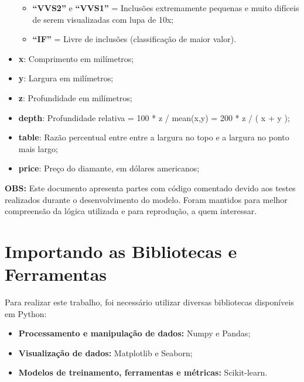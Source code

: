 \documentclass[11pt]{article}
\providecommand{\tightlist}{%
      \setlength{\itemsep}{0pt}\setlength{\parskip}{0pt}}
\begin{document}
\begin{itemize}
\begin{itemize}
      \item \textbf{``VVS2''} e \textbf{``VVS1''} = Inclusões
  extremamente pequenas e muito difíceis de serem visualizadas com lupa
  de 10x;
      \item \textbf{``IF''} = Livre de inclusões
  (classificação de maior valor).
  \end{itemize}
\item
  \textbf{x}: Comprimento em milímetros;
\item
  \textbf{y}: Largura em milímetros;
\item
  \textbf{z}: Profundidade em milímetros;
\item
  \textbf{depth}: Profundidade relativa = 100 * z / mean(x,y) = 200 * z
  / ( x + y );
\item
  \textbf{table}: Razão percentual entre entre a largura no topo e a
  largura no ponto mais largo;
\item
  \textbf{price}: Preço do diamante, em dólares americanos;

\end{itemize}

\bigskip

\textbf{OBS:} Este documento apresenta partes com código comentado
devido aos testes realizados durante o desenvolvimento do modelo.
Foram mantidos para melhor compreensão da lógica utilizada e para
reprodução, a quem interessar.

    \hypertarget{importando-as-bibliotecas-e-ferramentas}{%
\section{Importando as Bibliotecas e
Ferramentas}\label{importando-as-bibliotecas-e-ferramentas}}

    Para realizar este trabalho, foi necessário utilizar diversas
bibliotecas disponíveis em Python:

\begin{itemize}
\tightlist
\item
  \textbf{Processamento e manipulação de dados:} Numpy e Pandas;
\item
  \textbf{Visualização de dados:} Matplotlib e Seaborn;
\item
  \textbf{Modelos de treinamento, ferramentas e métricas:} Scikit-learn.
\end{itemize}
\end{document}
